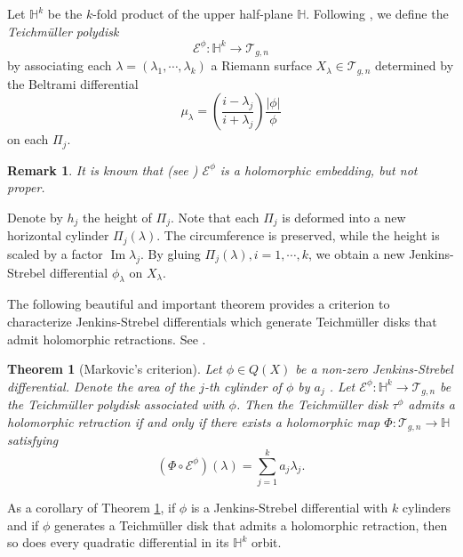 \documentclass[11pt]{amsart}
\theoremstyle{plain}
\newtheorem{Theorem}{Theorem}[section]
\newtheorem{Remark}{Remark}
\newcommand{\Tei}{\mathcal{T}}
\begin{document}
Let $\mathbb{H}^k$ be the $k$-fold product of the upper half-plane $\mathbb{H}$. Following \cite[Section 4]{Markovic2018}, we define the \emph{Teichm\"uller polydisk} $$\mathcal{E}^\phi:\mathbb{H}^k\rightarrow \Tei_{g,n}$$ by associating 
each ${\lambda}= (\lambda_1, \cdots, \lambda_k)$ a Riemann surface $X_\lambda\in \Tei_{g,n}$ determined by the Beltrami differential  $$\mu_\lambda=\left( \frac{i-\lambda_j}{i+\lambda_j} \right) \frac{|\phi|}{\phi}$$ 
on each $\Pi_{j}$. 

\begin{Remark}
  It is known that (see \cite[Section 4]{Markovic2018}) $\mathcal{E}^\phi$ is a holomorphic embedding, but not proper.
\end{Remark}

Denote by $h_j$ the height of $\Pi_{j}$.
Note that each $\Pi_j$ is deformed into a new horizontal cylinder $\Pi_j(\lambda)$.
The circumference is preserved, while the height is scaled by a factor $\operatorname{Im} \lambda_j$. 
By gluing $\Pi_j(\lambda), i =1, \cdots, k$, we obtain a
new Jenkins-Strebel differential $\phi_\lambda$ on $X_\lambda$.



The following beautiful and important theorem provides a criterion to characterize Jenkins-Strebel differentials which generate Teichm\"uller disks 
that admit holomorphic retractions.  See \cite[Theorem 4.1]{GM2020}.

\begin{Theorem}[Markovic's criterion]\label{thm:GM-JS}
      Let $\phi\in Q(X)$ be a non-zero Jenkins-Strebel differential. Denote the area of the $j$-th cylinder of $\phi$ by $a_j$ . Let $\mathcal{E}^{\phi}:\mathbb{H}^k\rightarrow\Tei_{g,n}$ be the Teichm\"{u}ller polydisk associated with $\phi$. Then the Teichm\"{u}ller disk $\tau^{\phi}$ admits a holomorphic retraction  if and only if there exists a holomorphic map $\Phi:\Tei_{g,n}\rightarrow \mathbb{H}$ satisfying \begin{equation}\label{equ:criterion}
       \left(\Phi\circ \mathcal{E}^\phi\right)(\lambda)=\sum\limits_{j=1}^{k}a_j\lambda_j.
      \end{equation}
\end{Theorem}

As a corollary of Theorem \ref{thm:GM-JS}, if $\phi$ is a Jenkins-Strebel differential with $k$ cylinders and if $\phi$ generates a Teichm\"uller disk that admits a holomorphic retraction, then so does every quadratic differential in its $\mathbb{H}^k$ orbit.
\end{document}
